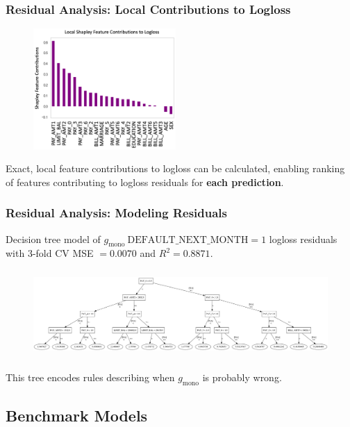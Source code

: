 \documentclass[11pt,
               aspectratio=43,
               hyperref={colorlinks}
               ]{beamer}
\begin{document}
			\begin{frame}
		
				\frametitle{\textbf{Residual Analysis}: Local Contributions to Logloss}
		
				\begin{figure}
					\begin{center}
						\includegraphics[height=130pt]{img/local.png}
					\end{center}
				\end{figure}	
				Exact, local feature contributions to logloss can be calculated, enabling ranking of features contributing to logloss residuals for \textbf{each prediction}.
			\end{frame}

			\begin{frame}[t]
		
				\frametitle{\textbf{Residual Analysis}: Modeling Residuals}
				Decision tree model of $g_{\text{mono}} ~\text{DEFAULT\_NEXT\_MONTH} =1$ logloss residuals with 3-fold CV MSE $=0.0070$ and $R^2=0.8871$.
				\begin{figure}
					\begin{center}
						\includegraphics[height=95pt, width=330pt]{img/surrogate_dt_1.png}
					\end{center}
				\end{figure}	
				This tree encodes rules describing when $g_{\text{mono}}$ is probably wrong.
			\end{frame}
			
		\subsection{Benchmark Models}
\end{document}
